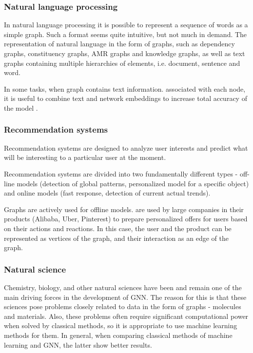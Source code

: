 \documentclass[a4paper,14pt]{article}
\begin{document}
\subsubsection*{Natural language processing}
In natural language processing it is possible to represent a sequence of words as a simple graph. Such a format seems quite intuitive, but not much in demand. The representation of natural language in the form of graphs, such as dependency graphs, constituency graphs, AMR graphs and knowledge graphs, as well as text graphs containing multiple hierarchies of elements, i.e. document, sentence and word.

In some tasks, when graph contains text information. associated with each node, it is useful to combine text and network embeddings to increase total accuracy of the model
 \cite{NLP-GNN}.
 
\subsubsection*{Recommendation systems}
Recommendation systems are designed to analyze user interests and predict what will be interesting to a particular user at the moment.

Recommendation systems are divided into two fundamentally different types - off-line models (detection of global patterns, personalized model for a specific object) and online models (fast response, detection of current actual trends). 

Graphs are actively used for offline models. are used by large companies in their products (Alibaba, Uber, Pinterest) to prepare personalized offers for users based on their actions and reactions. In this case, the user and the product can be represented as vertices of the graph, and their interaction as an edge of the graph.

\subsubsection*{Natural science}

Chemistry, biology, and other natural sciences have been and remain one of the main driving forces in the development of GNN. The reason for this is that these sciences pose problems closely related to data in the form of graphs - molecules and materials. Also, these problems often require significant computational power when solved by classical methods, so it is appropriate to use machine learning methods for them. In general, when comparing classical methods of machine learning and GNN, the latter show better results.
\end{document}
